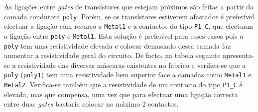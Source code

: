 \documentclass[11pt]{article}
\numberwithin{equation}{section}
\begin{document}
As ligações entre \textit{gates} de transístores que estejam próximos são feitas a partir da camada condutora \texttt{poly}. Porém, se os transístores estiverem afastados é preferível efectuar a ligação com recurso a \texttt{Metal1} e a contactos do tipo \texttt{P1\_C}, que efectuam a ligação entre \texttt{poly} e \texttt{Metal1}. Esta solução é preferível para esses casos pois a \texttt{poly} tem uma resistividade elevada e colocar demasiado dessa camada faz aumentar a resistividade geral do circuito. De facto, na tabela seguinte apresenta-se a resistividade das diversas máscaras existentes no fabrico e verifica-se que a \texttt{poly} (\texttt{poly1}) tem uma resistividade bem superior face a camadas como \texttt{Metal1} e \texttt{Metal2}. Verifica-se também que a resistividade de um contacto do tipo \texttt{P1\_C} é elevada, mas que compensa, uma vez que para efectuar uma ligação correcta entre duas \textit{gates} bastaria colocar no máximo 2 contactos.
\end{document}
